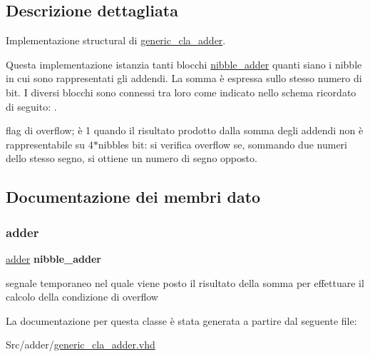\subsection{Descrizione dettagliata}
Implementazione structural di \hyperlink{classgeneric__cla__adder}{generic\+\_\+cla\+\_\+adder}.

Questa implementazione istanzia tanti blocchi \hyperlink{classnibble__adder}{nibble\+\_\+adder} quanti siano i nibble in cui sono rappresentati gli addendi. La somma è espressa sullo stesso numero di bit. I diversi blocchi sono connessi tra loro come indicato nello schema ricordato di seguito\+: . 

flag di overflow; è \textquotesingle{}1\textquotesingle{} quando il risultato prodotto dalla somma degli addendi non è rappresentabile su 4$\ast$nibbles bit\+: si verifica overflow se, sommando due numeri dello stesso segno, si ottiene un numero di segno opposto. 

\subsection{Documentazione dei membri dato}
\mbox{\label{classgeneric__cla__adder_1_1structural_a9d7a8a381439c61aea549e7a47ec7a6f}} 
\subsubsection{\texorpdfstring{adder}{adder}}
{\footnotesize\ttfamily \hyperlink{classgeneric__cla__adder_1_1structural_a9d7a8a381439c61aea549e7a47ec7a6f}{adder} {\bfseries \textcolor{vhdlchar}{nibble\+\_\+adder}\textcolor{vhdlchar}{ }} \hspace{0.3cm}{\ttfamily [Instantiation]}}

segnale temporaneo nel quale viene posto il risultato della somma per effettuare il calcolo della condizione di overflow 

La documentazione per questa classe è stata generata a partire dal seguente file\+:\begin{DoxyCompactItemize}
\item 
Src/adder/\hyperlink{generic__cla__adder_8vhd}{generic\+\_\+cla\+\_\+adder.\+vhd}\end{DoxyCompactItemize}
